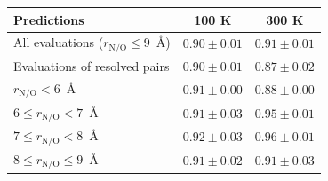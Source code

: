 \begin{tabular}{lcc}
\toprule
Predictions & 100 K & 300 K\\
\midrule
All evaluations ($r_\mathrm{N/O}\leq9$~\AA) & $0.90\pm0.01$ & $0.91\pm0.01$\\
Evaluations of resolved pairs & $0.90\pm0.01$ & $0.87\pm0.02$\\
$r_\mathrm{N/O}<6$~\AA & $0.91\pm0.00$ & $0.88\pm0.00$\\
$6\leq r_\mathrm{N/O}<7$~\AA & $0.91\pm0.03$ & $0.95\pm0.01$\\
$7\leq r_\mathrm{N/O}<8$~\AA & $0.92\pm0.03$ & $0.96\pm0.01$\\
$8\leq r_\mathrm{N/O}\leq9$~\AA & $0.91\pm0.02$ & $0.91\pm0.03$\\
\bottomrule
\end{tabular}
